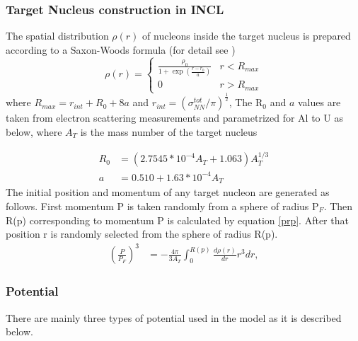 \subsubsection{Target Nucleus construction in INCL}\label{TargetNucleus}
The spatial distribution $\rho (r)$ of nucleons inside the target nucleus is prepared according to a Saxon-Woods formula (for detail see \cite{INCLboudard2013new})\\
\begin{equation}
	\rho (r)= \begin{cases} \frac{\rho_{0}}{1+\exp(\frac{r-r_{0}}{a})} &  r<R_{max}\\ 
		0 &  r> R_{max} \end{cases} 
\end{equation}
where $R_{max}=r_{int} + R_{0} + 8a$ and $r_{int}=(\sigma_{NN}^{tot}/\pi)^\frac{1}{2}$, 
The R$_{0}$ and $a$ values are taken from electron scattering measurements and parametrized for Al to U as below, where $A_T$ is the mass number of the target nucleus

\begin{align}
	R_{0} &=(2.7545*10^{-4}A_{T}+1.063)A_{T}^{1/3}\\
	a &=0.510 + 1.63 *10^{-4}A_{T}
\end{align}
The initial position and momentum of any target nucleon are generated as follows. First momentum P is taken randomly from a sphere of radius P$_{F}$. Then  R(p) corresponding to  momentum P is calculated by equation \ref{prp}. After that position r is randomly selected from the sphere of radius R(p).
\begin{align}
	\left(\frac{P}{P_{F}}\right)^{3}&=-\frac{4\pi}{3A_{T}}\int_{0}^{R(p)}\frac{d\rho(r)}{dr}r^{3}dr,\label{prp}
\end{align}
\subsubsection{Potential}
There are mainly three types of potential used in the model as it is described below.

